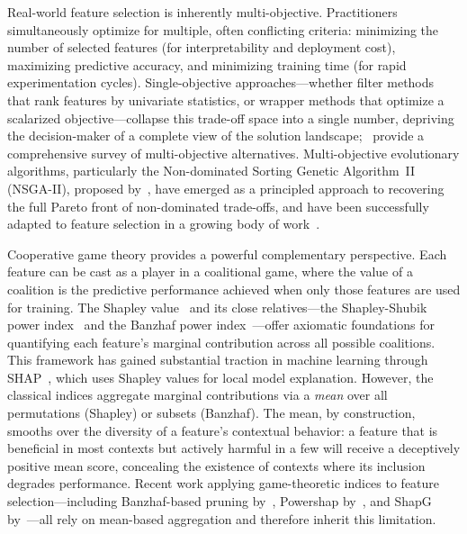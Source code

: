 \documentclass{article} %
\begin{document}
Real-world feature selection is inherently multi-objective. Practitioners simultaneously optimize for multiple, often conflicting criteria: minimizing the number of selected features (for interpretability and deployment cost), maximizing predictive accuracy, and minimizing training time (for rapid experimentation cycles). Single-objective approaches---whether filter methods that rank features by univariate statistics, or wrapper methods that optimize a scalarized objective---collapse this trade-off space into a single number, depriving the decision-maker of a complete view of the solution landscape;~\citet{jiao2024survey} provide a comprehensive survey of multi-objective alternatives. Multi-objective evolutionary algorithms, particularly the Non-dominated Sorting Genetic Algorithm~II (NSGA-II), proposed by~\citet{deb2002fast}, have emerged as a principled approach to recovering the full Pareto front of non-dominated trade-offs, and have been successfully adapted to feature selection in a growing body of work~\citep{hamdani2007multi,song2024evolutionary,shao2025evolutionary}.

Cooperative game theory provides a powerful complementary perspective. Each feature can be cast as a player in a coalitional game, where the value of a coalition is the predictive performance achieved when only those features are used for training. The Shapley value~\citep{shapley1953value} and its close relatives---the Shapley-Shubik power index~\citep{shapley1954method} and the Banzhaf power index~\citep{banzhaf1965weighted}---offer axiomatic foundations for quantifying each feature's marginal contribution across all possible coalitions. This framework has gained substantial traction in machine learning through SHAP~\citep{lundberg2017unified}, which uses Shapley values for local model explanation. However, the classical indices aggregate marginal contributions via a {\em mean} over all permutations (Shapley) or subsets (Banzhaf). The mean, by construction, smooths over the diversity of a feature's contextual behavior: a feature that is beneficial in most contexts but actively harmful in a few will receive a deceptively positive mean score, concealing the existence of contexts where its inclusion degrades performance. Recent work applying game-theoretic indices to feature selection---including Banzhaf-based pruning by~\citet{karavas2017feature}, Powershap by~\citet{verhaeghe2022powershap}, and ShapG by~\citet{zhao2025shapg}---all rely on mean-based aggregation and therefore inherit this limitation.
\end{document}

